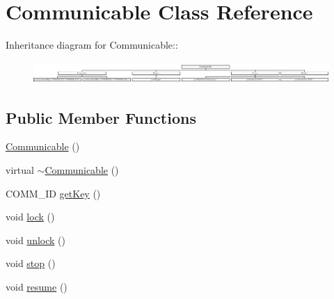\hypertarget{classCommunicable}{
\section{Communicable Class Reference}
\label{classCommunicable}
}
Inheritance diagram for Communicable::\begin{figure}[H]
\begin{center}
\leavevmode
\includegraphics[height=0.843373cm]{classCommunicable}
\end{center}
\end{figure}
\subsection*{Public Member Functions}
\begin{CompactItemize}
\item 
\hypertarget{classCommunicable_8ae1827ecf7569b3db1ed386c7d8ad78}{
\hyperlink{classCommunicable_8ae1827ecf7569b3db1ed386c7d8ad78}{Communicable} ()}
\label{classCommunicable_8ae1827ecf7569b3db1ed386c7d8ad78}

\item 
\hypertarget{classCommunicable_2280b0dfa0d3a515fccf62c2a9fd5f41}{
virtual \hyperlink{classCommunicable_2280b0dfa0d3a515fccf62c2a9fd5f41}{$\sim$Communicable} ()}
\label{classCommunicable_2280b0dfa0d3a515fccf62c2a9fd5f41}

\item 
\hypertarget{classCommunicable_db4307b69b9ccacff55fdbf84b8f50e4}{
COMM\_\-ID \hyperlink{classCommunicable_db4307b69b9ccacff55fdbf84b8f50e4}{get\-Key} ()}
\label{classCommunicable_db4307b69b9ccacff55fdbf84b8f50e4}

\item 
\hypertarget{classCommunicable_e1f8bd1ee810fd73d44315c95998d19d}{
void \hyperlink{classCommunicable_e1f8bd1ee810fd73d44315c95998d19d}{lock} ()}
\label{classCommunicable_e1f8bd1ee810fd73d44315c95998d19d}

\item 
\hypertarget{classCommunicable_caa814847192e71f434fbf9479ede862}{
void \hyperlink{classCommunicable_caa814847192e71f434fbf9479ede862}{unlock} ()}
\label{classCommunicable_caa814847192e71f434fbf9479ede862}

\item 
\hypertarget{classCommunicable_cb53e6534b947bc889aa181d9dbbd13b}{
void \hyperlink{classCommunicable_cb53e6534b947bc889aa181d9dbbd13b}{stop} ()}
\label{classCommunicable_cb53e6534b947bc889aa181d9dbbd13b}

\item 
\hypertarget{classCommunicable_3306a9adb11a0ab5af342c0db9f7bb2a}{
void \hyperlink{classCommunicable_3306a9adb11a0ab5af342c0db9f7bb2a}{resume} ()}
\label{classCommunicable_3306a9adb11a0ab5af342c0db9f7bb2a}

\end{CompactItemize}
